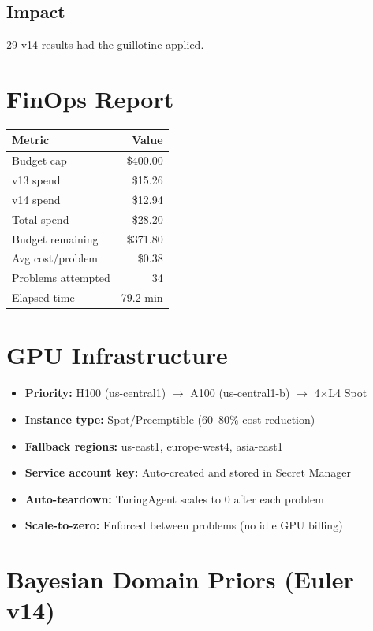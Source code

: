 \documentclass[12pt,a4paper]{article}
\begin{document}
\subsection*{Impact}
  29 v14 results had the guillotine applied.



\section{FinOps Report}

\begin{center}
\begin{tabular}{lr}
\toprule
\textbf{Metric} & \textbf{Value} \\
\midrule
  Budget cap & \$400.00 \\
  v13 spend & \$15.26 \\
  v14 spend & \$12.94 \\
  Total spend & \$28.20 \\
  Budget remaining & \$371.80 \\
  Avg cost/problem & \$0.38 \\
  Problems attempted & 34 \\
  Elapsed time & 79.2 min \\
  \bottomrule
\end{tabular}
\end{center}

\section{GPU Infrastructure}

\begin{itemize}
  \item \textbf{Priority:} H100 (us-central1) $\to$ A100 (us-central1-b) $\to$ 4$\times$L4 Spot
  \item \textbf{Instance type:} Spot/Preemptible (60--80\% cost reduction)
  \item \textbf{Fallback regions:} us-east1, europe-west4, asia-east1
  \item \textbf{Service account key:} Auto-created and stored in Secret Manager
  \item \textbf{Auto-teardown:} TuringAgent scales to 0 after each problem
  \item \textbf{Scale-to-zero:} Enforced between problems (no idle GPU billing)
\end{itemize}

\section{Bayesian Domain Priors (Euler v14)}
\end{document}
